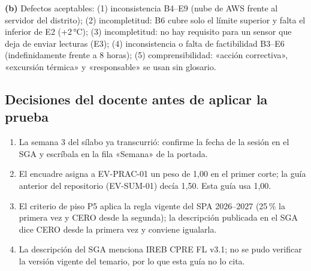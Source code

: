 \documentclass[11pt]{article}
\newcommand{\subseccion}[1]{\subsection{\textcolor{midblue}{#1}}}
\begin{document}
\textbf{(b)} Defectos aceptables: (1) inconsistencia B4--E9 (nube de AWS frente al servidor del distrito); (2) incompletitud: B6 cubre solo el límite superior y falta el inferior de E2 (+2\,°C); (3) incompletitud: no hay requisito para un sensor que deja de enviar lecturas (E3); (4) inconsistencia o falta de factibilidad B3--E6 (indefinidamente frente a 8 horas); (5) comprensibilidad: «acción correctiva», «excursión térmica» y «responsable» se usan sin glosario.

\subseccion{Decisiones del docente antes de aplicar la prueba}

\begin{enumerate}[leftmargin=18pt,itemsep=2pt]
	\item La semana 3 del sílabo ya transcurrió: confirme la fecha de la sesión en el SGA y escríbala en la fila «Semana» de la portada.
	\item El encuadre asigna a EV-PRAC-01 un peso de 1,00 en el primer corte; la guía anterior del repositorio (EV-SUM-01) decía 1,50. Esta guía usa 1,00.
	\item El criterio de piso P5 aplica la regla vigente del SPA 2026--2027 (25\,\% la primera vez y CERO desde la segunda); la descripción publicada en el SGA dice CERO desde la primera vez y conviene igualarla.
	\item La descripción del SGA menciona IREB CPRE FL v3.1; no se pudo verificar la versión vigente del temario, por lo que esta guía no lo cita.
\end{enumerate}

\fi



\end{document}
